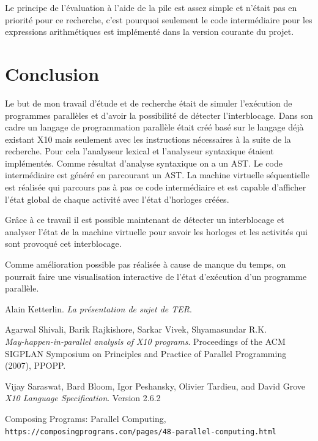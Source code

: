 \documentclass[12pt]{scrartcl}
\begin{document}
Le principe de l'évaluation à l'aide de la pile est assez simple et n'était pas en priorité pour ce recherche, c'est pourquoi 
seulement le code intermédiaire pour les expressions arithmétiques est implémenté dans la version courante du projet.
\newpage

\section{Conclusion}
Le but de mon travail d'étude et de recherche était de simuler l'exécution de programmes parallèles et d'avoir la possibilité
de détecter l'interblocage. Dans son cadre un langage de programmation parallèle était créé basé sur le langage déjà existant X10
mais seulement avec les instructions nécessaires à la suite de la recherche. 
Pour cela l'analyseur lexical et l'analyseur syntaxique étaient implémentés. Comme résultat d'analyse syntaxique on a un AST. 
Le code intermédiaire est généré en parcourant un AST. La machine virtuelle séquentielle est réalisée qui parcours pas à pas ce code intermédiaire
et est capable d'afficher l'état global de chaque activité avec l'état d'horloges créées.

Grâce à ce travail il est possible maintenant de détecter un interblocage et analyser l'état de la machine virtuelle pour savoir les horloges et les activités 
qui sont provoqué cet interblocage.

Comme amélioration possible pas réalisée à cause de manque du temps, on pourrait faire une visualisation interactive de l'état d'exécution
d'un programme parallèle.

\newpage      
\begin{thebibliography}{9}
  Alain Ketterlin.
  \textit{La présentation de sujet de TER}. 
   
  Agarwal Shivali, Barik Rajkishore, Sarkar Vivek, Shyamasundar R.K.\\
  \textit{May-happen-in-parallel analysis of X10 programs}.
  Proceedings of the ACM SIGPLAN Symposium on Principles and Practice of Parallel Programming (2007), PPOPP.
   
  Vijay Saraswat, Bard Bloom, Igor Peshansky, Olivier Tardieu, and David Grove
  \textit{X10 Language Specification}. 
  Version 2.6.2

  Composing Programs: Parallel Computing,
  \\\texttt{https://composingprograms.com/pages/48-parallel-computing.html}
  \end{thebibliography}
 
\end{document}
